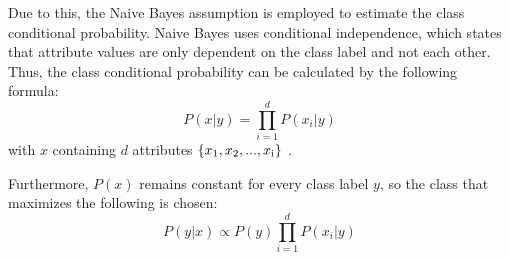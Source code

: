 Due to this, the Naive Bayes assumption is employed to estimate the class conditional probability. Naive Bayes uses conditional independence, which states that attribute values are only dependent on the class label and not each other. Thus, the class conditional probability can be calculated by the following formula:
\begin{equation}
\label{eq:naive_assumption}
            P(x|y) = \prod_{i=1}^{d}P(x_{i}|y)
\end{equation}
with $x$ containing $d$ attributes $\{x\textsubscript{1},x\textsubscript{2},...,x\textsubscript{i}\}$ \cite{DBLP:books/aw/TanSKK2019}.

Furthermore, $P(x)$ remains constant for every class label $y$, so the class that maximizes the following is chosen:
\begin{equation}
\label{eq:naive_final}
            P(y|x)\propto P(y)\prod_{i=1}^{d}P(x_{i}|y)
\end{equation}      










